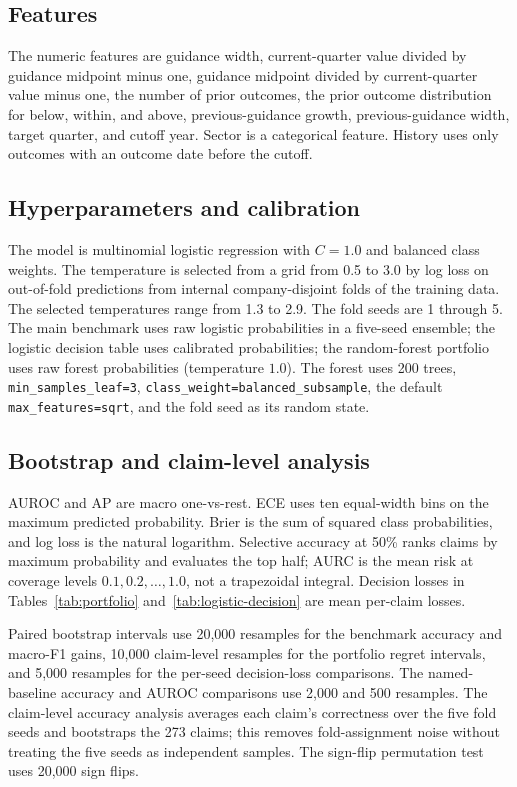 \documentclass[11pt]{article}
\begin{document}
\subsection{Features}
The numeric features are guidance width, current-quarter value divided by guidance midpoint minus one, guidance midpoint divided by current-quarter value minus one, the number of prior outcomes, the prior outcome distribution for below, within, and above, previous-guidance growth, previous-guidance width, target quarter, and cutoff year. Sector is a categorical feature. History uses only outcomes with an outcome date before the cutoff.

\subsection{Hyperparameters and calibration}
The model is multinomial logistic regression with $C=1.0$ and balanced class weights. The temperature is selected from a grid from 0.5 to 3.0 by log loss on out-of-fold predictions from internal company-disjoint folds of the training data. The selected temperatures range from 1.3 to 2.9. The fold seeds are 1 through 5. The main benchmark uses raw logistic probabilities in a five-seed ensemble; the logistic decision table uses calibrated probabilities; the random-forest portfolio uses raw forest probabilities (temperature $1.0$). The forest uses 200 trees, \texttt{min\_samples\_leaf=3}, \texttt{class\_weight=balanced\_subsample}, the default \texttt{max\_features=sqrt}, and the fold seed as its random state.

\subsection{Bootstrap and claim-level analysis}
AUROC and AP are macro one-vs-rest. ECE uses ten equal-width bins on the
maximum predicted probability. Brier is the sum of squared class probabilities,
and log loss is the natural logarithm. Selective accuracy at 50\% ranks claims
by maximum probability and evaluates the top half; AURC is the mean risk at
coverage levels $0.1,0.2,\dots,1.0$, not a trapezoidal integral. Decision
losses in Tables~\ref{tab:portfolio} and~\ref{tab:logistic-decision} are mean
per-claim losses.

Paired bootstrap intervals use 20,000 resamples for the benchmark accuracy and macro-F1 gains, 10,000 claim-level resamples for the portfolio regret intervals, and 5,000 resamples for the per-seed decision-loss comparisons. The named-baseline accuracy and AUROC comparisons use 2,000 and 500 resamples. The claim-level accuracy analysis averages each claim's correctness over the five fold seeds and bootstraps the 273 claims; this removes fold-assignment noise without treating the five seeds as independent samples. The sign-flip permutation test uses 20,000 sign flips.
\end{document}
